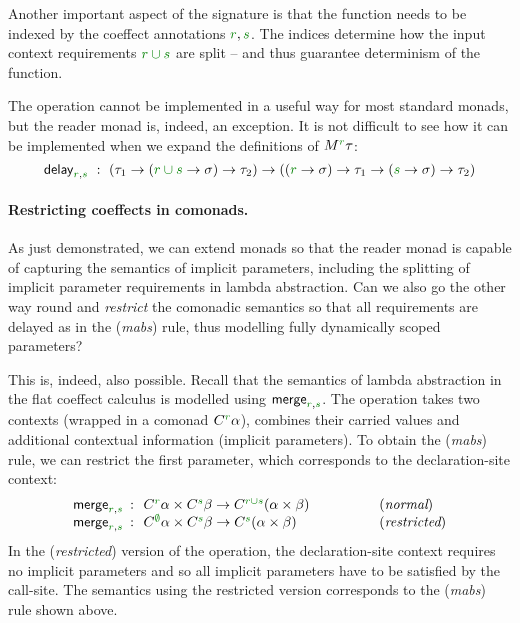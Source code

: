 Another important aspect of the signature is that the function needs to be indexed by the coeffect
annotations $\cclrd{r}, \cclrd{s}$. The indices determine how the input context requirements
$\cclrd{r \cup s}$ are split -- and thus guarantee determinism of the function. 

The operation cannot be implemented in a useful way for most standard monads, but the 
reader monad is, indeed, an exception. It is not difficult to see how it can be implemented
when we expand the definitions of $\mtyp{\cclrd{r}}\tau$:
%
\begin{equation*}
\ident{delay}_{\cclrd{r}, \cclrd{s}}~:~
(\tau_1\rightarrow(\cclrd{r \cup s} \rightarrow \sigma) \rightarrow \tau_2) \rightarrow 
((\cclrd{r} \rightarrow \sigma) \rightarrow \tau_1\rightarrow(\cclrd{s} \rightarrow \sigma) \rightarrow \tau_2)
\end{equation*}

\paragraph{Restricting coeffects in comonads.} 
As just demonstrated, we can extend monads so that the reader monad is capable of capturing
the semantics of implicit parameters, including the splitting of implicit parameter requirements
in lambda abstraction. Can we also go the other way round and \emph{restrict} the comonadic
semantics so that all requirements are delayed as in the (\emph{mabs}) rule, thus modelling 
fully dynamically scoped parameters?

This is, indeed, also possible. Recall that the semantics of lambda abstraction in the flat
coeffect calculus is modelled using $\ident{merge}_{\cclrd{r}, \cclrd{s}}$. The operation takes
two contexts (wrapped in a comonad $\ctyp{\cclrd{r}}\alpha$), combines their carried values and
additional contextual information (implicit parameters). To obtain the (\emph{mabs}) rule, we 
can restrict the first parameter, which corresponds to the declaration-site context:
%
\begin{equation*}
\begin{array}{rcll}
 \ident{merge}_{\cclrd{r}, \cclrd{s}} &\narrow{:}& \ctyp{\cclrd{r}}\alpha \times \ctyp{\cclrd{s}}\beta \rightarrow \ctyp{\cclrd{r \cup s}}(\alpha \times \beta)
 &\hspace{4em}(\textit{normal}) \\
 \ident{merge}_{\cclrd{r}, \cclrd{s}} &\narrow{:}& \ctyp{\cclrd{\emptyset}}\alpha \times \ctyp{\cclrd{s}}\beta \rightarrow \ctyp{\cclrd{s}}(\alpha \times \beta)
 &\hspace{4em}(\textit{restricted})
\end{array} 
\end{equation*}
%
In the (\emph{restricted}) version of the operation, the declaration-site context requires
no implicit parameters and so all implicit parameters have to be satisfied by the call-site.
The semantics using the restricted version corresponds to the (\emph{mabs}) rule shown above.

